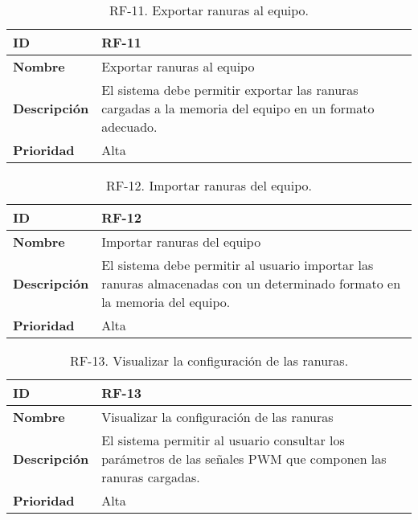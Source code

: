 \begin{table}[h!]
    \centering
    \begin{tabular}{|m{2.5cm}|m{9.27cm}|}
        \hline
        \textbf{ID} & RF-11 \\
        \hline
        \textbf{Nombre} & Exportar ranuras al equipo \\
        \hline
        \textbf{Descripción} & El sistema debe permitir exportar las ranuras cargadas a la memoria del equipo en un formato adecuado. \\
        \hline
        \textbf{Prioridad} & Alta \\
        \hline
    \end{tabular}
    \caption{RF-11. Exportar ranuras al equipo.}
\end{table}
\label{tab:rf11}

\begin{table}[h!]
    \centering
    \begin{tabular}{|m{2.5cm}|m{9.27cm}|}
        \hline
        \textbf{ID} & RF-12 \\
        \hline
        \textbf{Nombre} & Importar ranuras del equipo \\
        \hline
        \textbf{Descripción} & El sistema debe permitir al usuario importar las ranuras almacenadas con un determinado formato en la memoria del equipo. \\
        \hline
        \textbf{Prioridad} & Alta \\
        \hline
    \end{tabular}
    \caption{RF-12. Importar ranuras del equipo.}
\end{table}
\label{tab:rf12}

\begin{table}[h!]
    \centering
    \begin{tabular}{|m{2.5cm}|m{9.27cm}|}
        \hline
        \textbf{ID} & RF-13 \\
        \hline
        \textbf{Nombre} & Visualizar la configuración de las ranuras \\
        \hline
        \textbf{Descripción} & El sistema permitir al usuario consultar los parámetros de las señales PWM que componen las ranuras cargadas. \\
        \hline
        \textbf{Prioridad} & Alta \\
        \hline
    \end{tabular}
    \caption{RF-13. Visualizar la configuración de las ranuras.}
\end{table}

